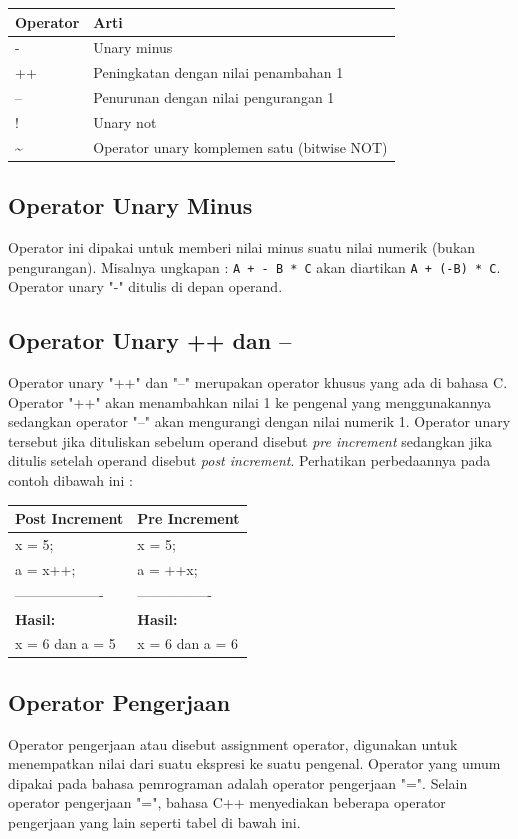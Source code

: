 \begin{longtable}[]{@{}ll@{}}
\toprule
Operator & Arti\tabularnewline
\midrule
\endhead
- & Unary minus\tabularnewline
++ & Peningkatan dengan nilai penambahan 1\tabularnewline
-- & Penurunan dengan nilai pengurangan 1\tabularnewline
! & Unary not\tabularnewline
\textasciitilde{} & Operator unary komplemen satu (bitwise
NOT)\tabularnewline
\bottomrule
\end{longtable}

\subsection{Operator Unary Minus}\label{b-operator-unary-minus}

Operator ini dipakai untuk memberi nilai minus suatu nilai numerik
(bukan pengurangan). Misalnya ungkapan : \texttt{A\ +\ -\ B\ *\ C} akan
diartikan \texttt{A\ +\ (-B)\ *\ C}. Operator unary "-" ditulis di
depan operand.

\subsection{Operator Unary ++ dan --}\label{c-operator-unary-dan}

Operator unary "++" dan "--" merupakan operator khusus yang ada di
bahasa C. Operator "++" akan menambahkan nilai 1 ke pengenal yang
menggunakannya sedangkan operator "--" akan mengurangi dengan nilai
numerik 1. Operator unary tersebut jika dituliskan sebelum operand
disebut \emph{pre increment} sedangkan jika ditulis setelah operand
disebut \emph{post increment}. Perhatikan perbedaannya pada contoh
dibawah ini :

\begin{longtable}[]{@{}ll@{}}
\toprule
Post Increment & Pre Increment\tabularnewline
\midrule
\endhead
x = 5; & x = 5;\tabularnewline
a = x++; & a = ++x;\tabularnewline
------------------- & ----------------\tabularnewline
\textbf{Hasil:} & \textbf{Hasil:}\tabularnewline
x = 6 dan a = 5 & x = 6 dan a = 6\tabularnewline
\bottomrule
\end{longtable}

\subsection{Operator Pengerjaan}\label{d-operator-pengerjaan}

Operator pengerjaan atau disebut assignment operator, digunakan untuk
menempatkan nilai dari suatu ekspresi ke suatu pengenal. Operator yang
umum dipakai pada bahasa pemrograman adalah operator pengerjaan "=".
Selain operator pengerjaan "=", bahasa C++ menyediakan beberapa
operator pengerjaan yang lain seperti tabel di bawah ini.

